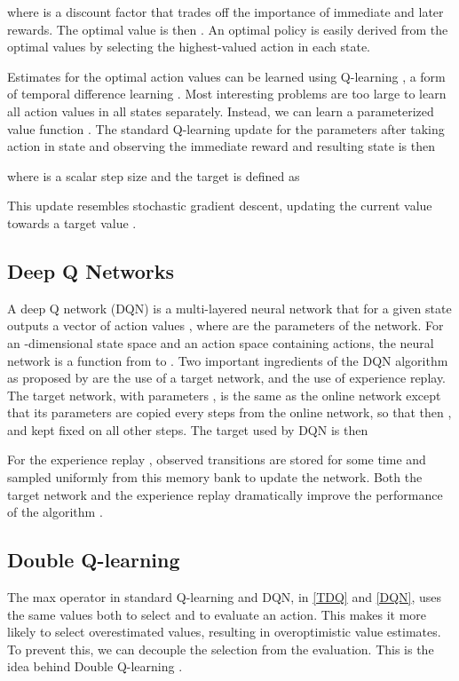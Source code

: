 \documentclass[letterpaper]{article}
\begin{document}
where  is a discount factor that trades off the importance of immediate and later rewards.
The optimal value is then . An optimal policy is easily derived from the optimal values by selecting the highest-valued action in each state.

Estimates for the optimal action values can be learned using Q-learning \citep{Watkins:1989}, a form of temporal difference learning \citep{Sutton:1988}.
Most interesting problems are too large to learn all action values in all states separately.  Instead, we can learn a parameterized value function .
The standard Q-learning update for the parameters after taking action  in state  and observing the immediate reward  and resulting state  is then

where  is a scalar step size and the target  is defined as

This update resembles stochastic gradient descent, updating the current value  towards a target value .

\subsection{Deep Q Networks} A deep Q network (DQN) is a multi-layered neural network that for a given state  outputs a vector of action values , where  are the parameters of the network.  For an -dimensional state space and an action space containing  actions, the neural network is a function from  to .
Two important ingredients of the DQN algorithm as proposed by \citet{Mnih:2015} are the use of a target network, and the use of experience replay.
The target network, with parameters , is the same as the online network except that its parameters are copied every  steps from the online network, so that then , and kept fixed on all other steps.  The target used by DQN is then

For the experience replay \citep{Lin:1992}, observed transitions are stored for some time and sampled uniformly from this memory bank to update the network. Both the target network and the experience replay dramatically improve the performance of the algorithm \citep{Mnih:2015}.


\subsection{Double Q-learning} The max operator in standard Q-learning and DQN, in \eqref{TDQ} and \eqref{DQN}, uses the same values both to select and to evaluate an action.  This makes it more likely to select overestimated values, resulting in overoptimistic value estimates.
To prevent this, we can decouple the selection from the evaluation.  This is the idea behind Double Q-learning \citep{vanHasselt:2010}.
\end{document}
